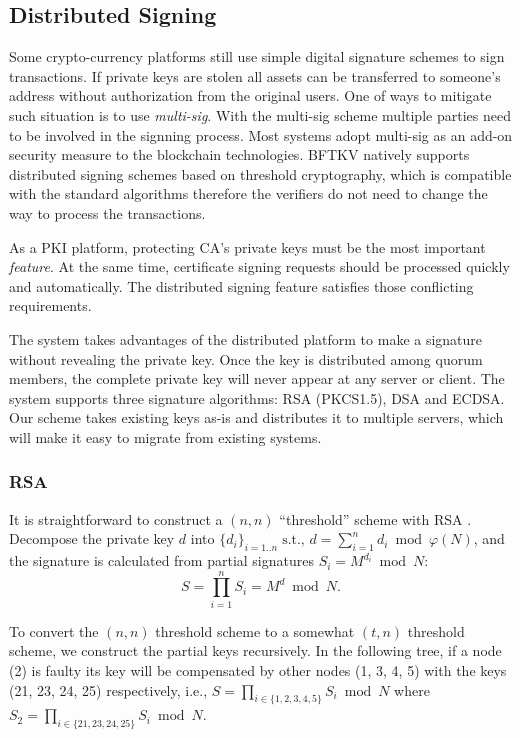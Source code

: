 \subsection{Distributed Signing}
Some crypto-currency platforms still use simple digital signature
schemes to sign transactions. If private keys are stolen all assets
can be transferred to someone's address without authorization from
the original users. One of ways to mitigate such situation is to
use {\em multi-sig}. With the multi-sig scheme multiple parties need
to be involved in the signning process. Most systems adopt multi-sig
as an add-on security measure to the blockchain technologies. BFTKV
natively supports distributed signing schemes based on threshold
cryptography, which is compatible with the standard algorithms
therefore the verifiers do not need to change the way to process the
transactions.

As a PKI platform, protecting CA's private keys must be the most
important {\em feature}. At the same time, certificate signing
requests should be processed quickly and automatically. The
distributed signing feature satisfies those conflicting requirements.

The system takes advantages of the distributed platform to make a
signature without revealing the private key. Once the key is
distributed among quorum members, the complete private key will never
appear at any server or client. The system supports three
signature algorithms: RSA (PKCS1.5), DSA and ECDSA. Our scheme takes
existing keys as-is and distributes it to multiple servers, which will
make it easy to migrate from existing systems.

\subsubsection*{RSA}
\label{thrsa}
It is straightforward to construct a $(n, n)$ ``threshold'' scheme with
RSA \cite{garay,rabin}. Decompose the private key $d$ into $\{d_i\}_{i =
1..n} \; \text{s.t., } d = \sum_{i=1}^{n} d_i \bmod \varphi(N)$, and the
signature is calculated from partial signatures $S_i = M^{d_i} \bmod
N$:
\[
  S = \prod_{i=1}^{n} S_i = M^d \bmod N.
\]

To convert the $(n, n)$ threshold scheme to a somewhat $(t, n)$
threshold scheme, we construct the partial keys recursively. In the
following tree, if a node (2) is faulty its key will be compensated
by other nodes (1, 3, 4, 5) with the keys (21, 23, 24, 25)
respectively, i.e., $S = \prod_{i \in \{1,2,3,4,5\}} S_i \bmod N$
where $S_2 = \prod_{i \in \{21,23,24,25\}} S_i \bmod N$.

